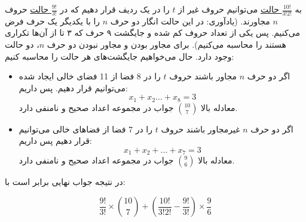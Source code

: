 \p
به
\underline{$\frac{10!}{3!2!}$ حالت}
 می‌توانیم حروف غیر از 
$t$ را در یک ردیف قرار دهیم که در 
\underline{$\frac{9!}{3!}$ حالت}
 حروف 
$n$ مجاورند.
(یادآوری: در این حالت انگار دو حرف $n$ را با یکدیگر یک حرف فرض می‌کنیم. پس یکی از تعداد حروف کم شده و جایگشت ۹ حرف که ۳ تا از آن‌ها تکراری هستند را محاسبه می‌کنیم).
برای مجاور بودن و مجاور نبودن دو حرف 
$n$،
دو حالت وجود دارد. حال می‌خواهیم جایگشت‌های هر حالت را محاسبه ‌کنیم:
\begin{itemize}
\item 
اگر دو حرف
 $n$ 
 مجاور باشند حروف 
 $t$
  را در 8 فضا از 11 فضای خالی ایجاد شده می‌توانیم قرار دهیم. پس داریم:
$$x_1 + x_2 \ldots + x_8 = 3$$
 معادله بالا 
 \underline{$\binom{10}{7}$}
جواب در مجموعه اعداد صحیح و نامنفی دارد.

\item 
اگر دو حرف
 $n$ 
 غیرمجاور باشند حروف
  $t$ را در 7 فضا از فضاهای خالی می‌توانیم قرار دهیم پس داریم:
$$x_1 + x_2 + \ldots + x_7 = 3$$
 معادله بالا 
 \underline{$\binom{9}{6}$}
جواب در مجموعه اعداد صحیح و نامنفی دارد. 
\end{itemize}
در نتیجه جواب نهایی برابر است با:

$$\frac{9!}{3!}\times\binom{10}{7} + (\frac{10!}{3!2!} - \frac{9!}{3!})\times\frac{9}{6}$$